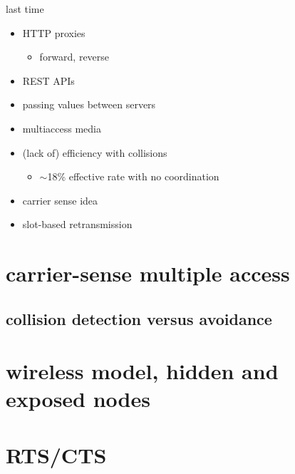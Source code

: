 \date{}
\title{}
\date{}
\usepackage{pgfplots}
\pgfplotsset{compat=1.14}

\begin{frame}
    \titlepage
\end{frame}

\begin{frame}{last time}
    \begin{itemize}
    \item HTTP proxies
        \begin{itemize}
        \item forward, reverse
        \end{itemize}
    \item REST APIs
    \item passing values between servers
    \item multiaccess media
    \item (lack of) efficiency with collisions
        \begin{itemize}
        \item $\sim$18\% effective rate with no coordination
        \end{itemize}
    \item carrier sense idea
    \item slot-based retransmission
    \end{itemize}
\end{frame}


\section{carrier-sense multiple access}


\subsection{collision detection versus avoidance}


\section{wireless model, hidden and exposed nodes} 


\section{RTS/CTS}


